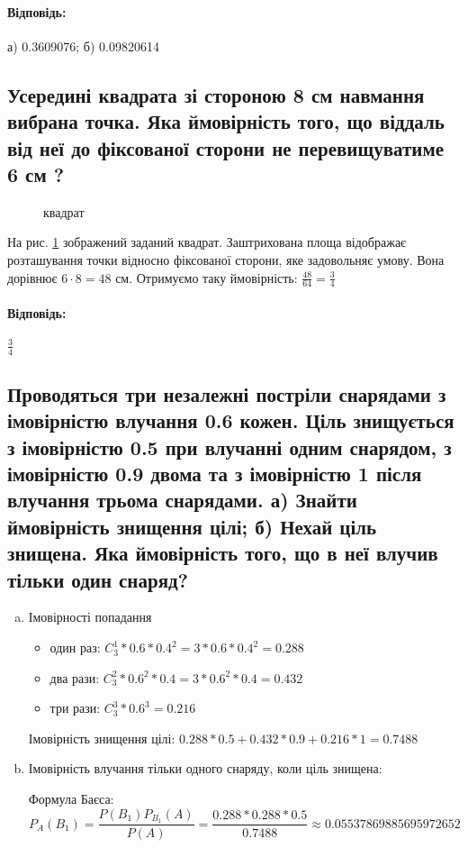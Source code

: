 \documentclass[a4paper, 12pt, oneside]{extarticle}
\newcommand{\Problem}{\subsection}
\newcommand{\Answer}[1]{
\medskip
\null\hfill
\begin{boxedminipage}{\textwidth}
	\paragraph{Відповідь: }{#1}
\end{boxedminipage}
}
\begin{document}
\Answer{
	а) 0.3609076;
	б) 0.09820614
}

\Problem{
	Усередині квадрата зі стороною 8 см навмання вибрана точка. Яка ймовірність того, що віддаль від неї до фіксованої сторони не перевищуватиме 6 см ?
}

\begin{figure}[h]
	\centering
{}
	\caption{квадрат}
	\label{kvadrat}
\end{figure}

На рис. \ref{kvadrat} зображений заданий квадрат. Заштрихована площа відображає розташування точки відносно фіксованої сторони, яке задовольняє умову.
Вона дорівнює $6 \cdot 8 = 48$ см. Отримуємо таку ймовірність: $\frac{48}{64} = \frac{3}{4}$

\Answer{
	$\frac{3}{4}$
}

\Problem{
	Проводяться три незалежні постріли снарядами з імовірністю влучання 0.6 кожен. Ціль знищується з імовірністю 0.5 при влучанні одним снарядом, з імовірністю 0.9 двома та з імовірністю 1 після влучання трьома снарядами. а) Знайти ймовірність знищення цілі; б) Нехай ціль знищена. Яка ймовірність того, що в неї влучив тільки один снаряд?
}
\begin{enumerate}[a)]
	\item Імовірності попадання
		\begin{itemize}
			\item один раз:
				$
					C_3^1 * 0.6 * 0.4^2 = 3 * 0.6 * 0.4^2 = 0.288
				$
			\item два рази:
				$
					C_3^2 * 0.6^2 * 0.4 = 3 * 0.6^2 * 0.4 = 0.432
				$
			\item три рази:
				$
					C_3^3 * 0.6^3 = 0.216
				$
		\end{itemize}
		Імовірність знищення цілі:
		$
		0.288 * 0.5 + 0.432 * 0.9 + 0.216 * 1
		= 0.7488
		$ %
	\item Імовірність влучання тільки одного снаряду, коли ціль знищена:

		Формула Баєса:
		$$
		P_A(B_1) = \frac{P(B_1)P_{B_1}(A)}{P(A)}
		= \frac{0.288 * 0.288 * 0.5}{0.7488}
		\approx 0.05537869885695972652
		$$

\end{enumerate}
\end{document}
